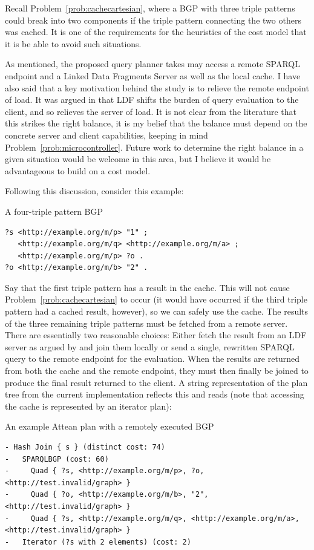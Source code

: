 Recall Problem~\ref{prob:cachecartesian}, where a BGP with three
triple patterns could break into two components if the triple pattern
connecting the two others was cached. It is one of the requirements
for the heuristics of the cost model that it is be able to avoid such
situations.

As mentioned, the proposed query planner takes may access a remote
SPARQL endpoint and a Linked Data Fragments Server as well as the
local cache. I have also said that a key motivation behind the study
is to relieve the remote endpoint of load. It was argued in
\cite{verborgh2014querying} that LDF shifts the burden of query
evaluation to the client, and so relieves the server of load. It is
not clear from the literature that this strikes the right balance, it
is my belief that the balance must depend on the concrete server and
client capabilities, keeping in mind
Problem~\ref{prob:microcontroller}. Future work to determine the right
balance in a given situation would be welcome in this area, but I
believe it would be advantageous to build on a cost model.

Following this discussion, consider this example:
\begin{example}{A four-triple pattern BGP}\label{ex:bgp4}
\begin{verbatim}
?s <http://example.org/m/p> "1" ;
   <http://example.org/m/q> <http://example.org/m/a> ;
   <http://example.org/m/p> ?o .
?o <http://example.org/m/b> "2" .
\end{verbatim}
\end{example}
Say that the first triple pattern has a result in the cache. This will
not cause Problem~\ref{prob:cachecartesian} to occur (it would have
occurred if the third triple pattern had a cached result, however), so
we can safely use the cache. The results of the three remaining triple
patterns must be fetched from a remote server. There are essentially
two reasonable choices: Either fetch the result from an LDF server as
argued by \cite{verborgh2014querying} and join them locally or send a
single, rewritten SPARQL query to the remote endpoint for the
evaluation. When the results are returned from both the cache and the
remote endpoint, they must then finally be joined to produce the final
result returned to the client. A string representation of the plan
tree from the current implementation reflects this and reads (note
that accessing the cache is represented by an iterator plan):
\begin{example}{An example Attean plan with a remotely executed BGP}
\begin{verbatim}
- Hash Join { s } (distinct cost: 74)
-   SPARQLBGP (cost: 60)
-     Quad { ?s, <http://example.org/m/p>, ?o, <http://test.invalid/graph> }
-     Quad { ?o, <http://example.org/m/b>, "2", <http://test.invalid/graph> }
-     Quad { ?s, <http://example.org/m/q>, <http://example.org/m/a>, <http://test.invalid/graph> }
-   Iterator (?s with 2 elements) (cost: 2)
\end{verbatim}
\end{example}

